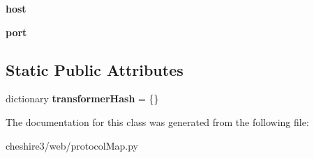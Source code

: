 \begin{DoxyCompactItemize}
\item 
\hypertarget{classcheshire3_1_1web_1_1protocol_map_1_1_z3950_protocol_map_a0cbbb1978fd92c2f2b5c23d6ce7ca0b0}{{\bfseries host}}\label{classcheshire3_1_1web_1_1protocol_map_1_1_z3950_protocol_map_a0cbbb1978fd92c2f2b5c23d6ce7ca0b0}

\item 
\hypertarget{classcheshire3_1_1web_1_1protocol_map_1_1_z3950_protocol_map_a09952879f0d20f984c105bd8a6da5a40}{{\bfseries port}}\label{classcheshire3_1_1web_1_1protocol_map_1_1_z3950_protocol_map_a09952879f0d20f984c105bd8a6da5a40}

\end{DoxyCompactItemize}
\subsection*{Static Public Attributes}
\begin{DoxyCompactItemize}
\item 
\hypertarget{classcheshire3_1_1web_1_1protocol_map_1_1_z3950_protocol_map_a47122104dce32f1044a765eaa0a5967a}{dictionary {\bfseries transformer\-Hash} = \{\}}\label{classcheshire3_1_1web_1_1protocol_map_1_1_z3950_protocol_map_a47122104dce32f1044a765eaa0a5967a}

\end{DoxyCompactItemize}


The documentation for this class was generated from the following file\-:\begin{DoxyCompactItemize}
\item 
cheshire3/web/protocol\-Map.\-py\end{DoxyCompactItemize}
